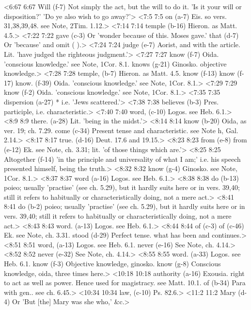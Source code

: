 <6:67 6:67  Will (f-7)  Not simply the act, but the will to do it. 'Is it your will  or disposition?' 'Do ye also wish to go away?'>
<7:5 7:5  on (a-7)  Eis. so vers. 31,38,39,48. see Note, 2Tim. 1.12.>
<7:14 7:14  temple (b-16)  Hieron. as Matt. 4.5.>
<7:22 7:22  gave (c-3)  Or 'wonder because of this. Moses gave.'
  that (d-7)  Or 'because' and omit ( ).>
<7:24 7:24  judge (e-7)  Aorist, and with the article. Lit. 'have judged the righteous  judgment.'>
<7:27 7:27  know (f-7)  Oida. 'conscious knowledge.' see Note, 1Cor. 8.1.
  knows (g-21)  Ginosko. objective knowledge.>
<7:28 7:28  temple, (b-7)  Hieron. as Matt. 4.5.
  know (f-13)  know (f-17)  know. (f-39)
  Oida. 'conscious knowledge.' see Note, 1Cor. 8.1.>
<7:29 7:29  know (f-2)  Oida. 'conscious knowledge.' see Note, 1Cor. 8.1.>
<7:35 7:35  dispersion (a-27)  * i.e. 'Jews scattered.'>
<7:38 7:38  believes (b-3)  Pres. participle, i.e. characteristic.>
<7:40 7:40  word, (c-10)  Logos. see Heb. 6.1.>
<8:9 8:9  there. (a-28)  Lit. 'being in the midst.'>
<8:14 8:14  know (b-20)  Oida, as ver. 19; ch. 7.29.
  come (c-34)  Present tense and characteristic. see Note h, Gal. 2.14.>
<8:17 8:17  true. (d-16)  Deut. 17.6 and 19.15.>
<8:23 8:23  from (e-8)  from (e-12)
  Ek. see Note, ch. 3.31; lit. 'of those things which are.'>
<8:25 8:25  Altogether (f-14)  'in the principle and universality of what I am;' i.e. his  speech presented himself, being the truth.>
<8:32 8:32  know (g-4)  Ginosko. see Note, 1Cor. 8.1.>
<8:37 8:37  word (a-16)  Logos. see Heb. 6.1.>
<8:38 8:38  do (b-13)  poieo; usually 'practise' (see ch. 5.29), but it hardly  suits here or in vers. 39,40; still it refers to habitually or  characteristically doing, not a mere act.>
<8:41 8:41  do (b-2)  poieo; usually 'practise' (see ch. 5.29), but it hardly  suits here or in vers. 39,40; still it refers to habitually or  characteristically doing, not a mere act.>
<8:43 8:43  word. (a-13)  Logos. see Heb. 6.1.>
<8:44 8:44  of (c-3)  of (c-46)  Ek. see Note, ch. 3.31.
  stood (d-29)  Perfect tense. what has been and continues.>
<8:51 8:51  word, (a-13)  Logos. see Heb. 6.1.
  never (e-16) See Note, ch. 4.14.>
<8:52 8:52  never (e-32)  See Note, ch. 4.14.>
<8:55 8:55  word. (a-33)  Logos. see Heb. 6.1.
  know (f-3)  Objective knowledge, ginosko.
  know (g-8)  Conscious knowledge, oida, three times here.>
<10:18 10:18  authority (a-16)  Exousia. right to act as well as power. Hence used for  magistracy. see Matt. 10.1.
  of (b-34)  Para with gen.. see ch. 6.45.>
<10:34 10:34  law, (c-10)  Ps. 82.6.>
<11:2 11:2  Mary (d-4)  Or 'But [the] Mary was she who,' &c.>
